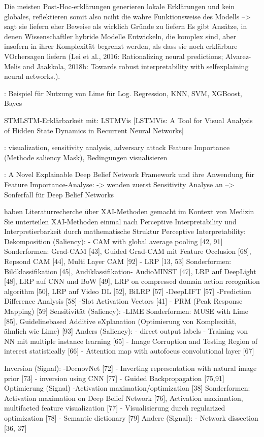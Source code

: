 Die meisten Post-Hoc-erklärungen generieren lokale Erklärungen und kein globales, reflektieren somit also nciht die wahre Funktionsweise des Modells \cite{vaughan2020human} --> sagt sie liefern eher Beweise als wirklich Gründe zu liefern
Es gibt Ansätze, in denen Wissenschaftler hybride Modelle Entwickeln, die komplex sind, aber insofern in ihrer Komplexität begrenzt werden, als dass sie noch erklärbare VOrhersagen liefern (Lei et al., 2016: Rationalizing neural predictions; Alvarez-Melis and Jaakkola, 2018b: Towards robust interpretability with selfexplaining neural networks.).

\cite{hasib2022machine}: Beispiel für Nutzung von Lime für Log. Regression, KNN, SVM, XGBoost, Bayes

\cite{rajabiyazdi2020machine} STMLSTM-Erklärbarkeit mit:  LSTMVis [LSTMVis: A Tool for Visual Analysis of Hidden State Dynamics in Recurrent Neural Networks] 

\cite{chen2021novel}: visualization, sensitivity analysis, adversary attack
Feature Importance (Methode saliency Mask), Bedingungen visualisieren

\cite{chen2021novel}: A Novel Explainable Deep Belief Network Framework und ihre Anwendung für Feature Importance-Analyse: -> wenden zuerst Sensitivity Analyse an --> Sonferfall für Deep Belief Networks

\cite{tjoa2020survey} haben Literaturrecherche über XAI-Methoden gemacht im Kontext von Medizin
Sie unterteilen XAI-Methoden einmal nach Perceptive Interpretability und Interpretierbarkeit durch mathematische Struktur
Perceptive Interpretability:
Dekomposition (Saliency):
- CAM with global average pooling [42, 91]
Sonderformen: Grad-CAM [43], Guided Grad-CAM mit Feature Occlusion [68], Repsond CAM [44], Multi Layer CAM [92]
- LRP [13, 53]
Sonderformen: Bildklassifikation [45], Audiklassifikation- AudioMINST [47], LRP auf DeepLight [48], LRP auf CNN und BoW [49], LRP on compressed domain action recognition algorithm [50], LRP auf Video DL [52], BiLRP [57]
-DeepLIFT [57]
-Prediction Difference Analysis [58]
-Slot Activation Vectors [41]
- PRM (Peak Response Mapping) [59]
Sensitivität (Saliency):
-LIME
Sonderformen: MUSE with Lime [85], Guidelinebased Additive eXplanation (Optimierung von Komplexität, ähnlich wie Lime) [93]
Anders (Saliency):
- direct output labels - Training von NN mit multiple instance learning [65]
- Image Corruption and Testing Region of interest statistically [66]
- Attention map with autofocus convolutional layer [67]

Inversion (Signal):
-DecnovNet [72]
- Inverting representation with natural image prior [73]
- inversion using CNN [77]
- Guided Backpropagation [75,91]
Optimierung (Signal)
-Activation maximation/optimization [38]
Sonderformen: Activation maximation on Deep Belief Network [76], Activation maximation, multifacted feature visualization [77]
- Visualisierung durch regularized optimization [78]
- Semantic dictionary [79]
Andere (Signal):
- Network dissection [36, 37]

